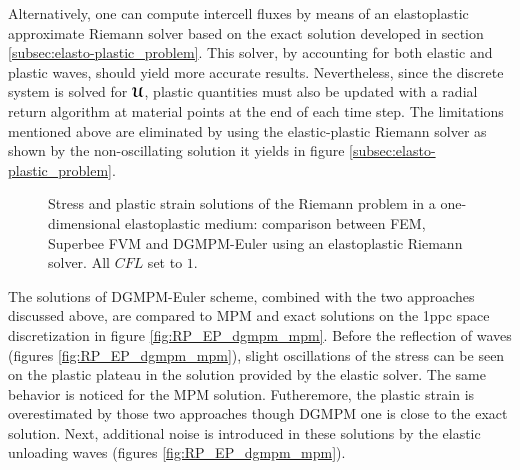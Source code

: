 Alternatively, one can compute intercell fluxes by means of an elastoplastic approximate Riemann solver based on the exact solution developed in section \ref{subsec:elasto-plastic_problem}. This solver, by accounting for both elastic and plastic waves, should yield more accurate results.
Nevertheless, since the discrete system is solved for ${\boldsymbol{\mathcal{U}}}$, plastic quantities must also be updated with a radial return algorithm at material points at the end of each time step. The limitations mentioned above are eliminated by using the elastic-plastic Riemann solver as shown by the non-oscillating solution it yields in figure \ref{subsec:elasto-plastic_problem}.

\begin{figure}[h!]
  \centering
  { \label{subfig:ep_dgmpm_fvm1}}
  { \label{subfig:ep_dgmpm_fvm2}}
  { \label{subfig:ep_dgmpm_fvm3}}
  {}
  \caption{Stress and plastic strain solutions of the Riemann problem in a one-dimensional elastoplastic medium: comparison between FEM, Superbee FVM and DGMPM-Euler using an elastoplastic Riemann solver. All $CFL$ set to $1$.}
  \label{fig:RP_EP_dgmpm_fvm}
\end{figure}
The solutions of DGMPM-Euler scheme, combined with the two approaches discussed above, are compared to MPM and exact solutions on the 1ppc space discretization in figure \ref{fig:RP_EP_dgmpm_mpm}.
Before the reflection of waves (figures \ref{fig:RP_EP_dgmpm_mpm}), slight oscillations of the stress can be seen on the plastic plateau in the solution provided by the elastic solver. The same behavior is noticed for the MPM solution. Futheremore, the plastic strain is overestimated by those two approaches though DGMPM one is close to the exact solution. Next, additional noise is introduced in these solutions by the elastic unloading waves (figures \ref{fig:RP_EP_dgmpm_mpm}).


